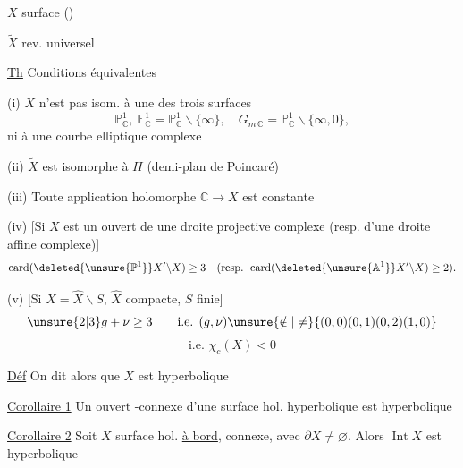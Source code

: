 $X$ surface  ()

$\widetilde X$ rev. universel


\uline{Th} Conditions équivalentes

(i) $X$ n'est pas isom. à une des trois surfaces
\[
\mathbb P^1_{\mathbb C},\ \mathbb E^1_{\mathbb C}=\mathbb P^1_{\mathbb C}\backslash\{\infty\},\quad G_{m\,\mathbb C}=\mathbb P^1_{\mathbb C}\backslash\{\infty,0\},
\]
ni à une courbe elliptique complexe

(ii) $\widetilde X$ est isomorphe à $H$ (demi-plan de Poincaré)

(iii) Toute application holomorphe $\mathbb C\longrightarrow X$ est constante

(iv) [Si $X$ est un ouvert de une droite projective complexe\deleted{]} (resp. d'une droite affine complexe)]
\[
\operatorname{card}(\deleted{\unsure{\mathbb P^1}}X'\backslash X)\ge3
\quad(\text{resp. }\operatorname{card}(\deleted{\unsure{\mathbb A^1}}X'\backslash X)\ge2).
\]

\deleted{(iv') [Si $X$ est un ouvert de \unsure{C. unif.}}

(v) [Si $X=\widehat X\backslash S$, $\widehat X$ compacte, $S$ finie]
\[
\unsure{2|3}g+\nu\ge3\qquad\text{i.e. }(g,\nu)\unsure{\notin|\ne}\{(0,0)(0,1)(0,2)(1,0)\}
\]
\[
\text{i.e. }\chi_c(X)<0
\]

\uline{Déf} On dit alors que $X$ est hyperbolique

\uline{Corollaire 1} Un ouvert -connexe d'une surface hol. hyperbolique est hyperbolique

\uline{Corollaire 2} Soit $X$ surface hol. \uline{à bord},  connexe, avec $\partial X\ne\varnothing$. Alors $\operatorname{Int}X$ est hyperbolique

